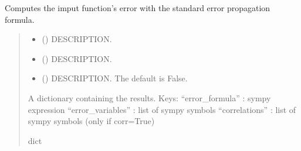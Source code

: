 \documentclass[letterpaper,10pt,english]{sphinxmanual}
\begin{document}
\begin{fulllineitems}
\label{\detokenize{functions:ggcas.functions.error_propagation}}
\pysigstartsignatures
{}
\pysigstopsignatures
\sphinxAtStartPar
Computes the imput function’s error with the standard error propagation
formula.
\begin{quote}\begin{description}
\begin{itemize}
\item {} 
\sphinxAtStartPar
{} () \textendash{} DESCRIPTION.

\item {} 
\sphinxAtStartPar
{} () \textendash{} DESCRIPTION.

\item {} 
\sphinxAtStartPar
{} (\sphinxstyleliteralemphasis{\sphinxupquote{, }}) \textendash{} DESCRIPTION. The default is False.

\end{itemize}

\sphinxAtStartPar
{} \textendash{} A dictionary containing the results.
Keys:
\sphinxhyphen{} “error\_formula” : sympy expression
\sphinxhyphen{} “error\_variables” : list of sympy symbols
\sphinxhyphen{} “correlations” : list of sympy symbols (only if corr=True)

\sphinxAtStartPar
dict

\end{description}\end{quote}

\end{fulllineitems}
\end{document}
